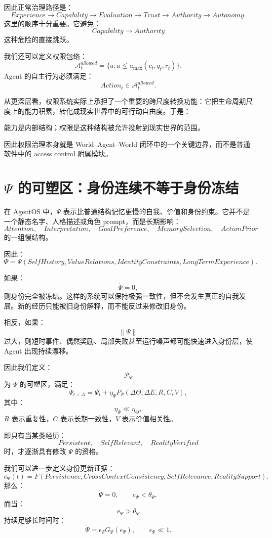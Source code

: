 因此正常治理路径是：
\[
Experience
\rightarrow
Capability
\rightarrow
Evaluation
\rightarrow
Trust
\rightarrow
Authority
\rightarrow
Autonomy.
\]
这里的顺序十分重要。它避免：
\[
Capability
\Rightarrow
Authority
\]
这种危险的直接跳跃。

我们还可以定义权限包络：
\[
\mathcal A_t^{allowed}
=
\{
a:
a\le a_{\max}(c_t,q_t,r_t)
\}.
\]
Agent 的自主行为必须满足：
\[
Action_t
\in
\mathcal A_t^{allowed}.
\]

从更深层看，权限系统实际上承担了一个重要的跨尺度转换功能：它把生命周期尺度上的能力积累，转化成现实世界中的可行动自由度。于是：
\begin{statementbox}
能力是内部结构；权限是这种结构被允许投射到现实世界的范围。
\end{statementbox}

因此权限治理本身就是 World--Agent--World 闭环中的一个关键边界，而不是普通软件中的 access control 附属模块。

\section{$\Psi$ 的可塑区：身份连续不等于身份冻结}

在 AgentOS 中，$\Psi$ 表示比普通结构记忆更慢的自我、价值和身份约束。它并不是一个静态名字、人格描述或角色 prompt，而是长期影响：
\[
Attention,\quad
Interpretation,\quad
GoalPreference,\quad
MemorySelection,\quad
ActionPrior
\]
的一组慢结构。

因此：
\[
\Psi
=
\Psi(
SelfHistory,
ValueRelations,
IdentityConstraints,
LongTermExperience
).
\]

如果：
\[
\dot\Psi=0,
\]
则身份完全被冻结。这样的系统可以保持极强一致性，但不会发生真正的自我发展。新的经历只能被旧身份解释，而不能反过来修改旧身份。

相反，如果：
\[
\|\dot\Psi\|
\]
过大，则短时事件、偶然奖励、局部失败甚至运行噪声都可能快速进入身份层，使 Agent 出现持续漂移。

因此我们定义：
\[
\boxed{
\mathcal P_\Psi
}
\]
为 $\Psi$ 的可塑区，满足：
\[
\Psi_{t+\Delta}
=
\Psi_t
+
\eta_\Psi
P_\Psi(
\Delta\Theta,
\Delta E,
R,
C,
V
),
\]
其中：
\[
\eta_\Psi
\ll
\eta_\Theta,
\]
$R$ 表示重复性，$C$ 表示长期一致性，$V$ 表示价值相关性。

即只有当某类经历：
\[
Persistent,
\quad
SelfRelevant,
\quad
RealityVerified
\]
时，才逐渐具有修改 $\Psi$ 的资格。

我们可以进一步定义身份更新证据：
\[
e_\Psi(t)
=
F(
Persistence,
CrossContextConsistency,
SelfRelevance,
RealitySupport
).
\]
那么：
\[
\dot\Psi
=
0,
\qquad
e_\Psi<\theta_\Psi,
\]
而当：
\[
e_\Psi>\theta_\Psi
\]
持续足够长时间时：
\[
\dot\Psi
=
\epsilon_\Psi G_\Psi(e_\Psi),
\qquad
\epsilon_\Psi\ll1.
\]

